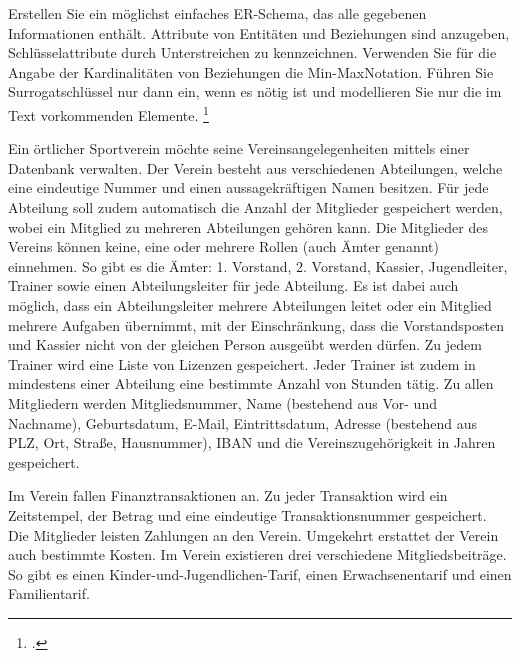 \documentclass{lehramt-informatik-aufgabe}
\begin{document}

Erstellen Sie ein möglichst einfaches ER-Schema, das alle gegebenen
Informationen enthält. Attribute von Entitäten und Beziehungen sind
anzugeben, Schlüsselattribute durch Unterstreichen zu kennzeichnen.
Verwenden Sie für die Angabe der Kardinalitäten von Beziehungen die
Min-MaxNotation. Führen Sie Surrogatschlüssel nur dann ein, wenn es
nötig ist und modellieren Sie nur die im Text vorkommenden Elemente.
\footcite{examen:66116:2019:09}

Ein örtlicher Sportverein möchte seine Vereinsangelegenheiten mittels
einer Datenbank verwalten. Der Verein besteht aus verschiedenen
Abteilungen, welche eine eindeutige Nummer und einen aussagekräftigen
Namen besitzen. Für jede Abteilung soll zudem automatisch die Anzahl der
Mitglieder gespeichert werden, wobei ein Mitglied zu mehreren
Abteilungen gehören kann. Die Mitglieder des Vereins können keine, eine
oder mehrere Rollen (auch Ämter genannt) einnehmen. So gibt es die
Ämter: 1. Vorstand, 2. Vorstand, Kassier, Jugendleiter, Trainer sowie
einen Abteilungsleiter für jede Abteilung. Es ist dabei auch möglich,
dass ein Abteilungsleiter mehrere Abteilungen leitet oder ein Mitglied
mehrere Aufgaben übernimmt, mit der Einschränkung, dass die
Vorstandsposten und Kassier nicht von der gleichen Person ausgeübt
werden dürfen. Zu jedem Trainer wird eine Liste von Lizenzen
gespeichert. Jeder Trainer ist zudem in mindestens einer Abteilung eine
bestimmte Anzahl von Stunden tätig. Zu allen Mitgliedern werden
Mitgliedsnummer, Name (bestehend aus Vor- und Nachname), Geburtsdatum,
E-Mail, Eintrittsdatum, Adresse (bestehend aus PLZ, Ort, Straße,
Hausnummer), IBAN und die Vereinszugehörigkeit in Jahren gespeichert.

Im Verein fallen Finanztransaktionen an. Zu jeder Transaktion wird ein
Zeitstempel, der Betrag und eine eindeutige Transaktionsnummer
gespeichert. Die Mitglieder leisten Zahlungen an den Verein. Umgekehrt
erstattet der Verein auch bestimmte Kosten. Im Verein existieren drei
verschiedene Mitgliedsbeiträge. So gibt es einen
Kinder-und-Jugendlichen-Tarif, einen Erwachsenentarif und einen
Familientarif.
\end{document}
